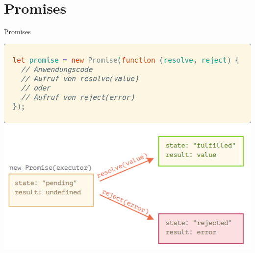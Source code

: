 \documentclass[t,handout]{beamer}
\begin{document}
\section{Promises}
\begin{frame}{Promises}
  \begin{center}
    \includegraphics[scale=.28]{fig/promises1.png}\\[.2cm]
    \includegraphics[scale=.6]{fig/promises2.png}
  \end{center}
\end{frame}
\end{document}
